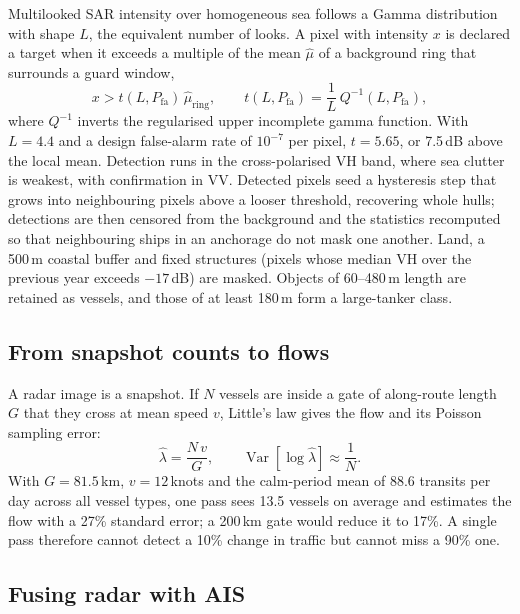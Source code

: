 \documentclass{article}
\begin{document}
Multilooked SAR intensity over homogeneous sea follows a Gamma distribution with shape $L$, the equivalent number of looks. A pixel with intensity $x$ is declared a target when it exceeds a multiple of the mean $\hat\mu$ of a background ring that surrounds a guard window,
\begin{equation}
  x > t(L, P_{\mathrm{fa}})\,\hat{\mu}_{\mathrm{ring}}, \qquad
  t(L, P_{\mathrm{fa}}) = \frac{1}{L}\,Q^{-1}\!\left(L, P_{\mathrm{fa}}\right),
  \label{eq:cfar}
\end{equation}
where $Q^{-1}$ inverts the regularised upper incomplete gamma function. With $L = 4.4$ and a design false-alarm rate of $10^{-7}$ per pixel, $t = 5.65$, or 7.5\,dB above the local mean. Detection runs in the cross-polarised VH band, where sea clutter is weakest, with confirmation in VV. Detected pixels seed a hysteresis step that grows into neighbouring pixels above a looser threshold, recovering whole hulls; detections are then censored from the background and the statistics recomputed so that neighbouring ships in an anchorage do not mask one another. Land, a 500\,m coastal buffer and fixed structures (pixels whose median VH over the previous year exceeds $-17$\,dB) are masked. Objects of 60--480\,m length are retained as vessels, and those of at least 180\,m form a large-tanker class.

\subsection{From snapshot counts to flows}

A radar image is a snapshot. If $N$ vessels are inside a gate of along-route length $G$ that they cross at mean speed $v$, Little's law \citep{little1961} gives the flow and its Poisson sampling error:
\begin{equation}
  \hat{\lambda} = \frac{N\,v}{G}, \qquad \operatorname{Var}\!\left[\log\hat{\lambda}\right] \approx \frac{1}{N}.
  \label{eq:little}
\end{equation}
With $G = 81.5$\,km, $v = 12$\,knots and the calm-period mean of 88.6 transits per day across all vessel types, one pass sees 13.5 vessels on average and estimates the flow with a 27\% standard error; a 200\,km gate would reduce it to 17\%. A single pass therefore cannot detect a 10\% change in traffic but cannot miss a 90\% one.

\subsection{Fusing radar with AIS}
\end{document}
